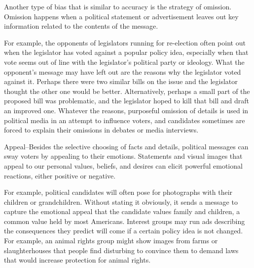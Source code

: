 \begin{definition}
    Another type of bias that is similar to accuracy is the strategy of omission. Omission happens when a political statement or advertisement leaves out key information related to the contents of the message.
    
    For example, the opponents of legislators running for re-election often point out when the legislator has voted against a popular policy idea, especially when that vote seems out of line with the legislator's political party or ideology. What the opponent's message may have left out are the reasons why the legislator voted against it. Perhaps there were two similar bills on the issue and the legislator thought the other one would be better. Alternatively, perhaps a small part of the proposed bill was problematic, and the legislator hoped to kill that bill and draft an improved one. Whatever the reasons, purposeful omission of details is used in political media in an attempt to influence voters, and candidates sometimes are forced to explain their omissions in debates or media interviews.
\end{definition}

\begin{definition}
    Appeal–Besides the selective choosing of facts and details, political messages can sway voters by appealing to their emotions. Statements and visual images that appeal to our personal values, beliefs, and desires can elicit powerful emotional reactions, either positive or negative.
    
    For example, political candidates will often pose for photographs with their children or grandchildren. Without stating it obviously, it sends a message to capture the emotional appeal that the candidate values family and children, a common value held by most Americans. Interest groups may run ads describing the consequences they predict will come if a certain policy idea is not changed. For example, an animal rights group might show images from farms or slaughterhouses that people find disturbing to convince them to demand laws that would increase protection for animal rights.
\end{definition}

